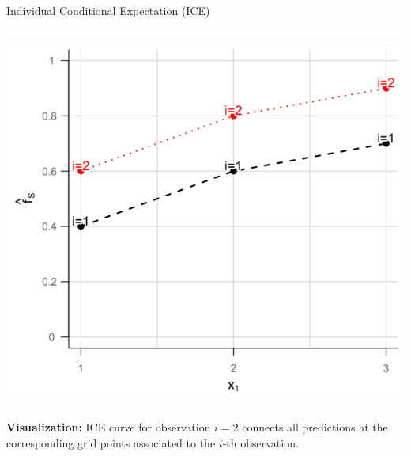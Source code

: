 \documentclass[11pt,compress,t,notes=noshow, xcolor=table]{beamer}
\begin{document}
\begin{vbframe}{Individual Conditional Expectation (ICE)}
\begin{onlyenv}
\begin{columns}[T]
\begin{column}{0.5\textwidth}
\begin{center}
\includegraphics[width=1\textwidth]{figure_man/ICE03.png}
\end{center}

\end{column}
\end{columns}
\end{onlyenv}
\textbf{Visualization:} ICE curve for observation $i=2$ connects all predictions at the corresponding grid points associated to the $i$-th observation.

\framebreak


\end{vbframe}
\end{document}
